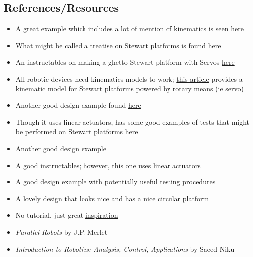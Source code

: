 \documentclass[a4paper, 10pt]{article}
\begin{document}
	\subsection{References/Resources}
	\begin{itemize}
		\item A great example which includes a lot of mention of kinematics is seen \href{https://ntrs.nasa.gov/api/citations/19910007810/downloads/19910007810.pdf}{here}
		\item What might be called a treatise on Stewart platforms is found \href{https://www.ri.cmu.edu/pub_files/pub4/fong_terrence_w_1990_1/fong_terrence_w_1990_1.pdf}{here}
		\item An instructables on making a ghetto Stewart platform with Servos \href{https://www.instructables.com/Stewart-Platform/}{here}
		\item All robotic devices need kinematics models to work; \href{https://www.xarg.org/paper/inverse-kinematics-of-a-stewart-platform/}{this article} provides a kinematic model for Stewart platforms powered by rotary means (ie servo)
		\item Another good design example found \href{https://iopscience.iop.org/article/10.1088/1757-899X/563/5/052059/pdf}{here}
		\item Though it uses linear actuators, has some good examples of tests that might be performed on Stewart platforms \href{https://www.ncbi.nlm.nih.gov/pmc/articles/PMC6513003/}{here}
		\item Another good \href{https://core.ac.uk/download/pdf/322824733.pdf}{design example}
		\item A good \href{https://www.instructables.com/Six-Axis-Platform-Using-Linear-Actuators-Stewart-P/}{instructables}; however, this one uses linear actuators
		\item A good \href{https://www.ohio.edu/mechanical-faculty/williams/html/PDF/IndRob02.pdf}{design example} with potentially useful testing procedures
		\item A \href{https://www.mdpi.com/2218-6581/7/2/30}{lovely design} that looks nice and has a nice circular platform
		\item No tutorial, just great \href{https://www.youtube.com/watch?v=kscvCQTtVvw&t=0s}{inspiration}
		\item \textit{Parallel Robots} by J.P. Merlet
		\item \textit{Introduction to Robotics: Analysis, Control, Applications} by Saeed Niku
	\end{itemize}
	
\end{document}
